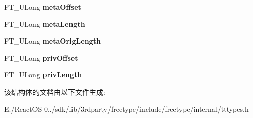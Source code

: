 \begin{DoxyCompactItemize}
\item 
\mbox{\label{struct_w_o_f_f___header_rec___ac93e010ba26ba188d948009c089a824d}} 
F\+T\+\_\+\+U\+Long {\bfseries meta\+Offset}
\item 
\mbox{\label{struct_w_o_f_f___header_rec___a5496776da0752cb2ff133c5068ceb0ab}} 
F\+T\+\_\+\+U\+Long {\bfseries meta\+Length}
\item 
\mbox{\label{struct_w_o_f_f___header_rec___a71ba111d9a0b7139db466f69dc47647f}} 
F\+T\+\_\+\+U\+Long {\bfseries meta\+Orig\+Length}
\item 
\mbox{\label{struct_w_o_f_f___header_rec___a28e0df8dd3d47a13bae3c339c438a0d8}} 
F\+T\+\_\+\+U\+Long {\bfseries priv\+Offset}
\item 
\mbox{\label{struct_w_o_f_f___header_rec___a5b2043f2356a61f1e41cfcd564ca5222}} 
F\+T\+\_\+\+U\+Long {\bfseries priv\+Length}
\end{DoxyCompactItemize}


该结构体的文档由以下文件生成\+:\begin{DoxyCompactItemize}
\item 
E\+:/\+React\+O\+S-\/0../sdk/lib/3rdparty/freetype/include/freetype/internal/tttypes.\+h\end{DoxyCompactItemize}
